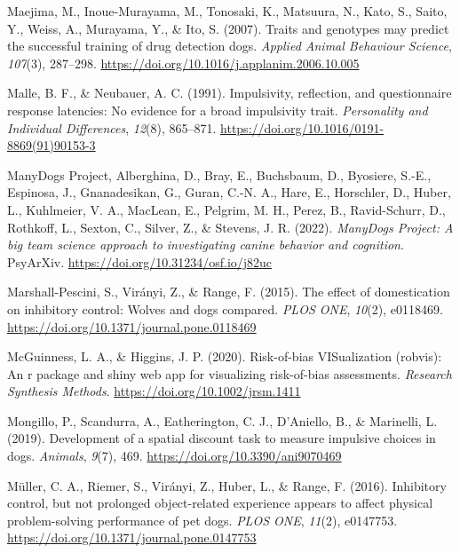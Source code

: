 \documentclass[
  ,pub,floatsintext]{apa6}
\newlength{\cslhangindent}
\newlength{\cslentryspacingunit} %
\newenvironment{CSLReferences}[2] %
 {%
  \setlength{\parindent}{0pt}
  \ifodd #1
  \let\oldpar\par
  \def\par{\hangindent=\cslhangindent\oldpar}
  \fi
  \setlength{\parskip}{#2\cslentryspacingunit}
 }%
 {}
\begin{document}
\begin{CSLReferences}{1}{0}
\leavevmode{}%
Maejima, M., Inoue-Murayama, M., Tonosaki, K., Matsuura, N., Kato, S., Saito, Y., Weiss, A., Murayama, Y., \& Ito, S. (2007). Traits and genotypes may predict the successful training of drug detection dogs. \emph{Applied Animal Behaviour Science}, \emph{107}(3), 287--298. \url{https://doi.org/10.1016/j.applanim.2006.10.005}

\leavevmode{}%
Malle, B. F., \& Neubauer, A. C. (1991). Impulsivity, reflection, and questionnaire response latencies: {No} evidence for a broad impulsivity trait. \emph{Personality and Individual Differences}, \emph{12}(8), 865--871. \url{https://doi.org/10.1016/0191-8869(91)90153-3}

\leavevmode{}%
ManyDogs Project, Alberghina, D., Bray, E., Buchsbaum, D., Byosiere, S.-E., Espinosa, J., Gnanadesikan, G., Guran, C.-N. A., Hare, E., Horschler, D., Huber, L., Kuhlmeier, V. A., MacLean, E., Pelgrim, M. H., Perez, B., Ravid-Schurr, D., Rothkoff, L., Sexton, C., Silver, Z., \& Stevens, J. R. (2022). \emph{{ManyDogs Project}: {A} big team science approach to investigating canine behavior and cognition}. {PsyArXiv}. \url{https://doi.org/10.31234/osf.io/j82uc}

\leavevmode{}%
Marshall-Pescini, S., Virányi, Z., \& Range, F. (2015). The effect of domestication on inhibitory control: Wolves and dogs compared. \emph{PLOS ONE}, \emph{10}(2), e0118469. \url{https://doi.org/10.1371/journal.pone.0118469}

\leavevmode{}%
McGuinness, L. A., \& Higgins, J. P. (2020). Risk-of-bias VISualization (robvis): An r package and shiny web app for visualizing risk-of-bias assessments. \emph{Research Synthesis Methods}. \url{https://doi.org/10.1002/jrsm.1411}

\leavevmode{}%
Mongillo, P., Scandurra, A., Eatherington, C. J., D'Aniello, B., \& Marinelli, L. (2019). Development of a spatial discount task to measure impulsive choices in dogs. \emph{Animals}, \emph{9}(7), 469. \url{https://doi.org/10.3390/ani9070469}

\leavevmode{}%
Müller, C. A., Riemer, S., Virányi, Z., Huber, L., \& Range, F. (2016). Inhibitory control, but not prolonged object-related experience appears to affect physical problem-solving performance of pet dogs. \emph{PLOS ONE}, \emph{11}(2), e0147753. \url{https://doi.org/10.1371/journal.pone.0147753}


\end{CSLReferences}
\end{document}
